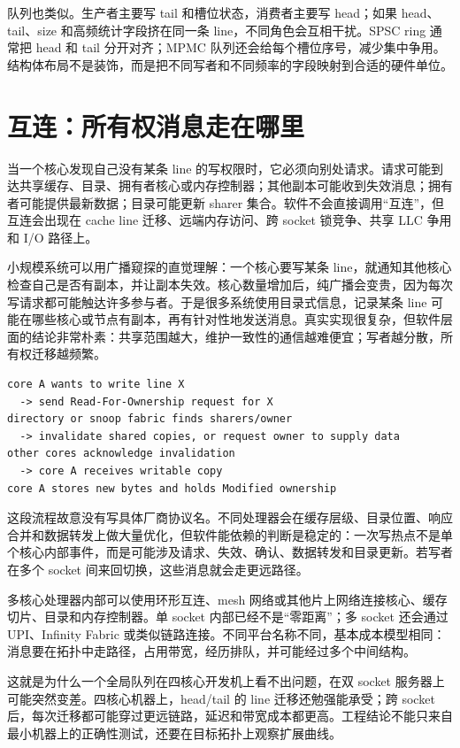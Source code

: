 队列也类似。生产者主要写 tail 和槽位状态，消费者主要写 head；如果 head、tail、size 和高频统计字段挤在同一条 line，不同角色会互相干扰。SPSC ring 通常把 head 和 tail 分开对齐；MPMC 队列还会给每个槽位序号，减少集中争用。结构体布局不是装饰，而是把不同写者和不同频率的字段映射到合适的硬件单位。

\section{互连：所有权消息走在哪里}

当一个核心发现自己没有某条 line 的写权限时，它必须向别处请求。请求可能到达共享缓存、目录、拥有者核心或内存控制器；其他副本可能收到失效消息；拥有者可能提供最新数据；目录可能更新 sharer 集合。软件不会直接调用“互连”，但互连会出现在 cache line 迁移、远端内存访问、跨 socket 锁竞争、共享 LLC 争用和 I/O 路径上。

小规模系统可以用广播窥探的直觉理解：一个核心要写某条 line，就通知其他核心检查自己是否有副本，并让副本失效。核心数量增加后，纯广播会变贵，因为每次写请求都可能触达许多参与者。于是很多系统使用目录式信息，记录某条 line 可能在哪些核心或节点有副本，再有针对性地发送消息。真实实现很复杂，但软件层面的结论非常朴素：共享范围越大，维护一致性的通信越难便宜；写者越分散，所有权迁移越频繁。

\begin{lstlisting}[numbers=none,caption={一次写权限请求的消息形态}]
core A wants to write line X
  -> send Read-For-Ownership request for X
directory or snoop fabric finds sharers/owner
  -> invalidate shared copies, or request owner to supply data
other cores acknowledge invalidation
  -> core A receives writable copy
core A stores new bytes and holds Modified ownership
\end{lstlisting}

这段流程故意没有写具体厂商协议名。不同处理器会在缓存层级、目录位置、响应合并和数据转发上做大量优化，但软件能依赖的判断是稳定的：一次写热点不是单个核心内部事件，而是可能涉及请求、失效、确认、数据转发和目录更新。若写者在多个 socket 间来回切换，这些消息就会走更远路径。

多核心处理器内部可以使用环形互连、mesh 网络或其他片上网络连接核心、缓存切片、目录和内存控制器。单 socket 内部已经不是“零距离”；多 socket 还会通过 UPI、Infinity Fabric 或类似链路连接。不同平台名称不同，基本成本模型相同：消息要在拓扑中走路径，占用带宽，经历排队，并可能经过多个中间结构。

这就是为什么一个全局队列在四核心开发机上看不出问题，在双 socket 服务器上可能突然变差。四核心机器上，head/tail 的 line 迁移还勉强能承受；跨 socket 后，每次迁移都可能穿过更远链路，延迟和带宽成本都更高。工程结论不能只来自最小机器上的正确性测试，还要在目标拓扑上观察扩展曲线。


